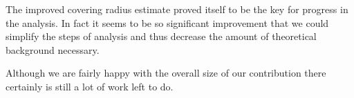 \documentclass[text.tex]{subfiles}
\begin{document}
The improved covering radius estimate proved itself to be the key for progress in the analysis. In fact it seems to be so significant improvement that we could simplify the steps of analysis and thus decrease the amount of theoretical background necessary. 

Although we are fairly happy with the overall size of our contribution there certainly is still a lot of work left to do. 
\end{document}

